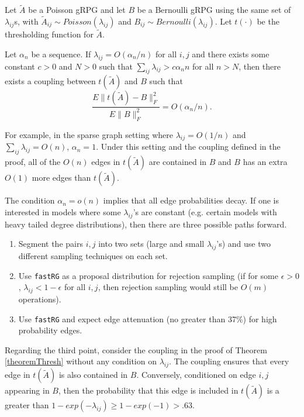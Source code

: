 \documentclass[twoside,11pt]{article}
\begin{document}
\begin{theorem} \label{theoremThresh}
Let $\tilde A$ be a Poisson gRPG and let $B$ be a Bernoulli gRPG using the same set of $\lambda_{ij}$s, with $\tilde A_{ij} \sim Poisson(\lambda_{ij})$ and ${B}_{ij}\sim Bernoulli(\lambda_{ij})$.  Let $t(\cdot)$ be the thresholding function for $\tilde A$.

Let $\alpha_n$  be a sequence.  If $\lambda_{ij} = O(\alpha_n/n)$ for all $i,j$ and there exists some constant $c>0$ and $N>0$ such that $\sum_{ij} \lambda_{ij} > c \alpha_n n$ for all $n>N$, then there exists a coupling between $t(\tilde A)$ and $B$ such that 
\[\frac{E\|t(\tilde A) - B\|^2_F}{E\|B\|^2_F}  = O(\alpha_n/n).\]
\end{theorem}

For example, in the sparse graph setting where $\lambda_{ij} = O(1/n)$ and $\sum_{ij} \lambda_{ij} = O(n)$, $\alpha_n = 1$.   Under this setting and the coupling defined in the proof, all of the $O(n)$ edges in $t(\tilde A)$ are contained in $B$ and $B$ has an extra $O(1)$ more edges than $t(\tilde A)$. 

The condition $\alpha_n = o(n)$ implies that all edge probabilities decay.  
If one is interested in models where some $\lambda_{ij}$'s are constant (e.g. certain models with heavy tailed degree distributions), then there are three possible paths forward.
\begin{enumerate}
\item Segment the pairs $i,j$ into two sets (large and small $\lambda_{ij}$'s) and use two different sampling techniques on each set.
\item  Use \texttt{fastRG} as a proposal distribution for rejection sampling (if for some $\epsilon>0$, $\lambda_{ij} < 1-\epsilon$ for all $i,j$, then rejection sampling would still be $O(m)$ operations).
\item Use \texttt{fastRG} and expect edge attenuation (no greater than 37\%) for high probability edges.  
\end{enumerate}
Regarding the third point, consider the coupling in the proof of Theorem \ref{theoremThresh} without any condition on $\lambda_{ij}$.  The coupling ensures that every edge in  $t(\tilde A)$ is also contained in $B$.  Conversely, conditioned on edge $i,j$ appearing in $B$, then the probability that this edge is included in $t(\tilde A)$ is a greater than $1-exp(-\lambda_{ij}) \ge 1-exp(-1) > .63$. 
\end{document}
